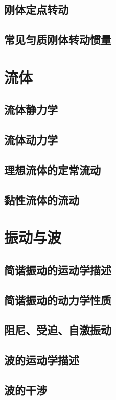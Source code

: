 \documentclass[zihao=-4,UTF8]{report}
\begin{document}
\section{刚体定点转动}
\section{常见匀质刚体转动惯量}

\chapter{流体}
\thispagestyle{fancy}

\section{流体静力学}
\section{流体动力学}
\section{理想流体的定常流动}
\section{黏性流体的流动}

\chapter{振动与波}
\thispagestyle{fancy}

\section{简谐振动的运动学描述}
\section{简谐振动的动力学性质}
\section{阻尼、受迫、自激振动}
\section{波的运动学描述}
\section{波的干涉}
\end{document}
